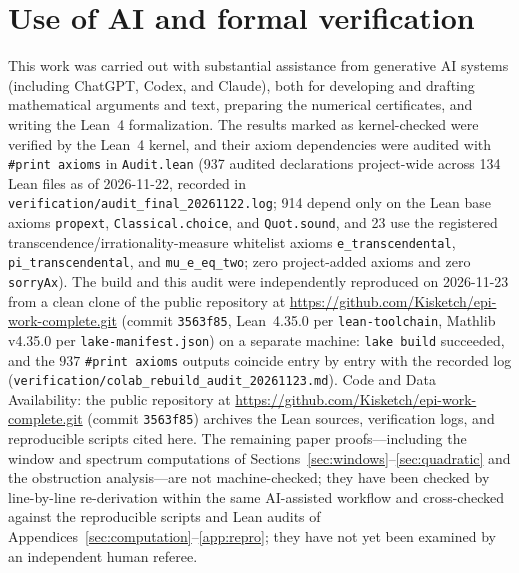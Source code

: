 \documentclass[11pt]{amsart}
\theoremstyle{definition}
\theoremstyle{remark}
\numberwithin{equation}{section}
\begin{document}
\section*{Use of AI and formal verification}
This work was carried out with substantial assistance from
generative AI systems (including ChatGPT, Codex, and Claude), both for
developing and drafting mathematical arguments and text,
preparing the numerical certificates, and writing the Lean~4
formalization. The results marked as kernel-checked were verified
by the Lean~4 kernel, and their axiom dependencies were audited
with \texttt{\#print axioms} in \texttt{Audit.lean} (937 audited
declarations project-wide across 134 Lean files as of 2026-11-22, recorded in
\texttt{verification/\allowbreak audit\_\allowbreak final\_\allowbreak 20261122.log};
914 depend only on the Lean base axioms \texttt{propext},
\texttt{Classical.choice}, and \texttt{Quot.sound}, and 23 use the
registered transcendence/irrationality-measure whitelist axioms
\texttt{e\_transcendental}, \texttt{pi\_transcendental}, and
\texttt{mu\_e\_eq\_two}; zero project-added axioms and zero
\texttt{sorryAx}). The build and this audit were independently reproduced on 2026-11-23 from a clean clone of the public repository at \url{https://github.com/Kisketch/epi-work-complete.git} (commit \texttt{3563f85}, Lean~4.35.0 per \texttt{lean-toolchain}, Mathlib v4.35.0 per \texttt{lake-manifest.json}) on a separate machine: \texttt{lake build} succeeded, and the $937$
\texttt{\#print axioms} outputs coincide entry by entry with the recorded log
(\texttt{verification/\allowbreak colab\_\allowbreak rebuild\_\allowbreak audit\_\allowbreak 20261123.md}). Code and Data Availability: the public repository at \url{https://github.com/Kisketch/epi-work-complete.git} (commit \texttt{3563f85}) archives the Lean sources, verification logs, and reproducible scripts cited here. The remaining
paper proofs---including the window and spectrum computations of
Sections~\ref{sec:windows}--\ref{sec:quadratic} and the obstruction
analysis---are not machine-checked; they have been checked by
line-by-line re-derivation within the same AI-assisted workflow
and cross-checked against the reproducible scripts and Lean
audits of Appendices~\ref{sec:computation}--\ref{app:repro}; they
have not yet been examined by an independent human referee.
\end{document}
